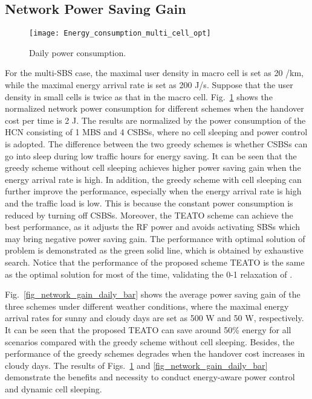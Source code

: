 \documentclass[12pt, draftclsnofoot,onecolumn]{IEEEtran}
\begin{document}
\subsection{Network Power Saving Gain}

\begin{figure}[t]
	\centering
	\texttt{[image: Energy\_consumption\_multi\_cell\_opt]}
	\caption{Daily power consumption.}\label{fig_network_gain_daily}
\end{figure}

For the multi-SBS case, the maximal user density in macro cell is set as 20 /km, while the maximal energy arrival rate is set as 200 J/s.
Suppose that the user density in small cells is twice as that in the macro cell. Fig.~\ref{fig_network_gain_daily} shows the normalized network power consumption for different schemes when the handover cost per time is 2 J.
The results are normalized by the power consumption of the HCN consisting of 1 MBS and 4 CSBSs, where no cell sleeping and power control is adopted. The difference between the two greedy schemes is whether CSBSs can go into sleep during low traffic hours for energy saving.
It can be seen that the greedy scheme without cell sleeping achieves higher power saving gain when the energy arrival rate is high.
In addition, the greedy scheme with cell sleeping can further improve the performance, especially when the energy arrival rate is high and the traffic load is low.
This is because the constant power consumption is reduced by turning off CSBSs.
Moreover, the TEATO scheme can achieve the best performance, as it adjusts the RF power and avoids activating SBSs which may bring negative power saving gain.
The performance with optimal solution of problem  is demonstrated as the green solid line, which is obtained by exhaustive search.
Notice that the performance of the proposed scheme TEATO is the same as the optimal solution for most of the time, validating the 0-1 relaxation of .

Fig.~\ref{fig_network_gain_daily_bar} shows the average power saving gain of the three schemes under different weather conditions, where the maximal energy arrival rates for sunny and cloudy days are set as 500 W and 50 W, respectively. It can be seen that the proposed TEATO can save around 50\% energy for all scenarios compared with the greedy scheme without cell sleeping.
Besides, the performance of the greedy schemes degrades when the handover cost increases in cloudy days.
The results of Figs.~\ref{fig_network_gain_daily} and \ref{fig_network_gain_daily_bar} demonstrate the benefits and necessity to conduct energy-aware power control and dynamic cell sleeping.
\end{document}
